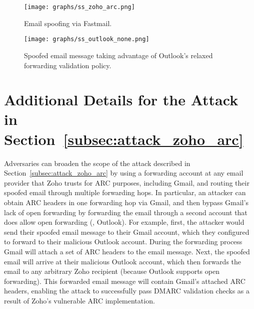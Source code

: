 \begin{figure}[t]
  \centerline{\texttt{[image: graphs/ss\_zoho\_arc.png]}}
  \centering
  \caption{Email spoofing  via Fastmail.}
  \label{fig:ss_zoho_arc}
  \end{figure}

\begin{figure}[t]
\centerline{\texttt{[image: graphs/ss\_outlook\_none.png]}}
\centering
\caption{Spoofed email message taking advantage of Outlook's relaxed forwarding validation policy.}
\label{fig:attack_none_ms}
\end{figure}


\section{Additional Details for the Attack in Section~\ref{subsec:attack_zoho_arc}}
\label{sec:appendix_zoho_attack_details}
Adversaries can broaden the scope of the attack described in Section~\ref{subsec:attack_zoho_arc} by using a forwarding
account at any email provider that Zoho trusts for ARC purposes,
including Gmail, and routing their spoofed email through multiple forwarding hops.
In particular, an attacker can obtain ARC headers in one forwarding hop via Gmail, and then bypass Gmail's lack of open forwarding by forwarding the email through a second account that does allow open forwarding (\eg, Outlook).
For example, first, the attacker would send their spoofed email message
to their Gmail account, which they configured to forward to their
malicious Outlook account.
During the forwarding process Gmail will
attach a set of ARC headers to the email message.
Next, the spoofed email will arrive at their malicious Outlook account, which then forwards the email to any arbitrary Zoho recipient (because Outlook
supports open forwarding).
This forwarded email message will contain Gmail's attached ARC headers, enabling the attack to successfully pass DMARC validation checks as a result of Zoho's vulnerable ARC implementation.

